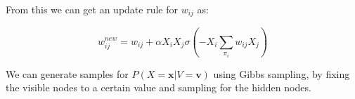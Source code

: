 \documentclass[11pt]{amsart}
\newcommand{\vek}[1]{\mathbf{#1}}
\begin{document}
From this we can get an update rule for $w_{ij}$ as:

\begin{equation}
w_{ij}^{new} = w_{ij} + \alpha X_{i} X_{j} \sigma(-X_{i} \sum_{\pi_i} w_{ij} X_{j})
\end{equation}

We can generate samples for $P(X = \vek{x}  \vert V = \vek{v})$ using Gibbs sampling, by fixing the visible nodes to a certain value and sampling for the hidden nodes. 




\end{document}
